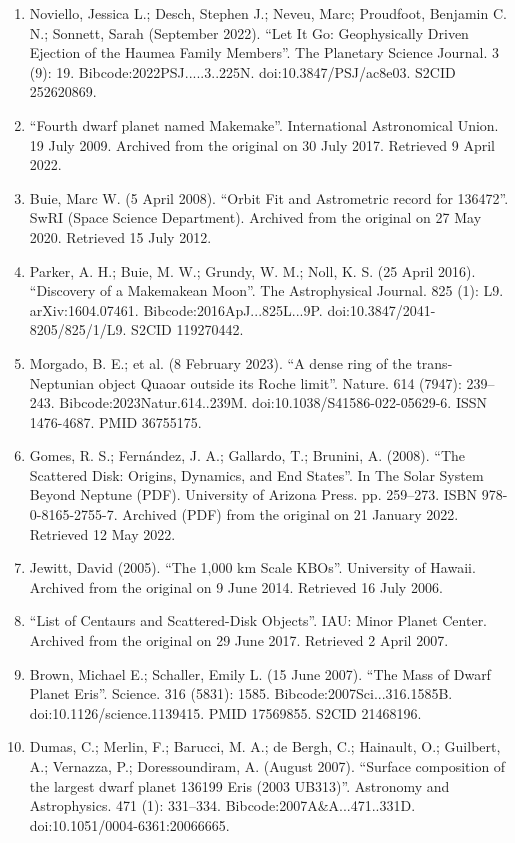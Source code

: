 \begin{enumerate}
\item Noviello, Jessica L.; Desch, Stephen J.; Neveu, Marc; Proudfoot, Benjamin C. N.; Sonnett, Sarah (September 2022). ``Let It Go: Geophysically Driven Ejection of the Haumea Family Members''. The Planetary Science Journal. 3 (9): 19. Bibcode:2022PSJ.....3..225N. doi:10.3847/PSJ/ac8e03. S2CID 252620869.
\item ``Fourth dwarf planet named Makemake''. International Astronomical Union. 19 July 2009. Archived from the original on 30 July 2017. Retrieved 9 April 2022.
\item Buie, Marc W. (5 April 2008). ``Orbit Fit and Astrometric record for 136472''. SwRI (Space Science Department). Archived from the original on 27 May 2020. Retrieved 15 July 2012.
\item Parker, A. H.; Buie, M. W.; Grundy, W. M.; Noll, K. S. (25 April 2016). ``Discovery of a Makemakean Moon''. The Astrophysical Journal. 825 (1): L9. arXiv:1604.07461. Bibcode:2016ApJ...825L...9P. doi:10.3847/2041-8205/825/1/L9. S2CID 119270442.
\item Morgado, B. E.; et al. (8 February 2023). ``A dense ring of the trans-Neptunian object Quaoar outside its Roche limit''. Nature. 614 (7947): 239–243. Bibcode:2023Natur.614..239M. doi:10.1038/S41586-022-05629-6. ISSN 1476-4687. PMID 36755175.
\item Gomes, R. S.; Fernández, J. A.; Gallardo, T.; Brunini, A. (2008). ``The Scattered Disk: Origins, Dynamics, and End States''. In The Solar System Beyond Neptune (PDF). University of Arizona Press. pp. 259–273. ISBN 978-0-8165-2755-7. Archived (PDF) from the original on 21 January 2022. Retrieved 12 May 2022.
\item Jewitt, David (2005). ``The 1,000 km Scale KBOs''. University of Hawaii. Archived from the original on 9 June 2014. Retrieved 16 July 2006.
\item ``List of Centaurs and Scattered-Disk Objects''. IAU: Minor Planet Center. Archived from the original on 29 June 2017. Retrieved 2 April 2007.
\item Brown, Michael E.; Schaller, Emily L. (15 June 2007). ``The Mass of Dwarf Planet Eris''. Science. 316 (5831): 1585. Bibcode:2007Sci...316.1585B. doi:10.1126/science.1139415. PMID 17569855. S2CID 21468196.
\item Dumas, C.; Merlin, F.; Barucci, M. A.; de Bergh, C.; Hainault, O.; Guilbert, A.; Vernazza, P.; Doressoundiram, A. (August 2007). ``Surface composition of the largest dwarf planet 136199 Eris (2003 UB313)''. Astronomy and Astrophysics. 471 (1): 331–334. Bibcode:2007A\&A...471..331D. doi:10.1051/0004-6361:20066665.

\end{enumerate}
